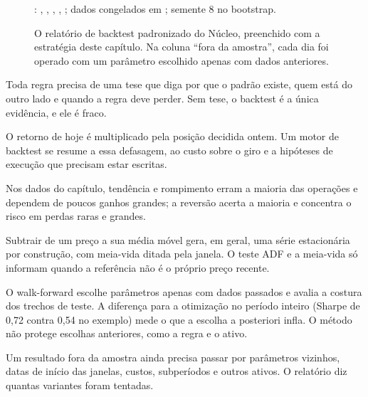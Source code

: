 \begin{figure}[p]
\begin{largo}
\begin{tcolorbox}[enhanced, sharp corners, colback=white, colframe=tinta, boxrule=0.6pt, boxsep=0pt,
  left=4mm, right=4mm, top=3.5mm, bottom=3mm, fontupper=\footnotesize, parbox=false]
 : , , , , ; dados congelados em ; semente 8 no bootstrap.\par
\end{tcolorbox}
\caption{O relatório de backtest padronizado do Núcleo, preenchido com a estratégia deste capítulo. Na coluna ``fora da amostra'', cada dia foi operado com um parâmetro escolhido apenas com dados anteriores.}
\label{fig:c11-relatorio}
\end{largo}
\end{figure}

\begin{resumo}
  \item Toda regra precisa de uma tese que diga por que o padrão existe, quem está do outro lado e quando a regra deve perder. Sem tese, o backtest é a única evidência, e ele é fraco.
  \item O retorno de hoje é multiplicado pela posição decidida ontem. Um motor de backtest se resume a essa defasagem, ao custo sobre o giro e a hipóteses de execução que precisam estar escritas.
  \item Nos dados do capítulo, tendência e rompimento erram a maioria das operações e dependem de poucos ganhos grandes; a reversão acerta a maioria e concentra o risco em perdas raras e grandes.
  \item Subtrair de um preço a sua média móvel gera, em geral, uma série estacionária por construção, com meia-vida ditada pela janela. O teste ADF e a meia-vida só informam quando a referência não é o próprio preço recente.
  \item O walk-forward escolhe parâmetros apenas com dados passados e avalia a costura dos trechos de teste. A diferença para a otimização no período inteiro (Sharpe de 0,72 contra 0,54 no exemplo) mede o que a escolha a posteriori infla. O método não protege escolhas anteriores, como a regra e o ativo.
  \item Um resultado fora da amostra ainda precisa passar por parâmetros vizinhos, datas de início das janelas, custos, subperíodos e outros ativos. O relatório diz quantas variantes foram tentadas.
\end{resumo}

